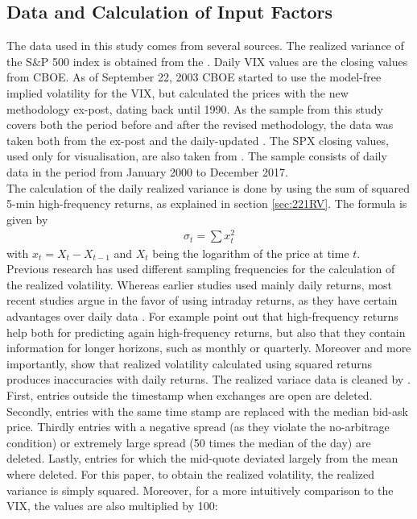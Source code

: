 \subsection{Data and Calculation of Input Factors}\label{sec:41Data}
The data used in this study comes from several sources. The realized variance of the S\&P 500 index is obtained from the \textcite{Oxford:RV}. Daily \ac{VIX} values are the closing values from \ac{CBOE}. As of September 22, 2003 \ac{CBOE} started to use the model-free implied volatility for the \ac{VIX}, but calculated the prices with the new methodology ex-post, dating back until 1990. As the sample from this study covers both the period before and after the revised methodology, the data was taken both from the ex-post \textcite{CBOE:old} and the daily-updated \textcite{CBOE:new}. The \ac{SPX} closing values, used only for visualisation, are also taken from \textcite{SandP}. The sample consists of daily data in the period from January 2000 to December 2017. \\
The calculation of the daily realized variance is done by \textcite{Oxford:RV} using the sum of squared 5-min high-frequency returns, as explained in section \ref{sec:221RV}. The formula is given by 
\begin{align}
\sigma_{t} = \sum x_{t}^{2}
\end{align}
with $x_{t} = X_{t} - X_{t-1}$ and $X_{t}$ being the logarithm of the price at time $t$. \\%
Previous research has used different sampling frequencies for the calculation of the realized volatility. Whereas earlier studies used mainly daily returns, most recent studies argue in the favor of using intraday returns, as they have certain advantages over daily data \parencite{jiang2003}. For example \textcite{andersen2003} point out that high-frequency returns help both for predicting again high-frequency returns, but also that they contain information for longer horizons, such as monthly or quarterly. Moreover and more importantly, \textcite{andersen1998} show that realized volatility calculated using squared returns produces inaccuracies with daily returns. The realized variace data is cleaned by \textcite{Oxford:RV}. First, entries outside the timestamp when exchanges are open are deleted. Secondly, entries with the same time stamp are replaced with the median bid-ask price. Thirdly entries with a negative spread (as they violate the no-arbitrage condition) or extremely large spread (50 times the median of the day) are deleted. Lastly, entries for which the mid-quote deviated largely from the mean where deleted. For this paper, to obtain the realized volatility, the realized variance is simply squared. Moreover, for a more intuitively comparison to the \ac{VIX}, the values are also multiplied by 100:
